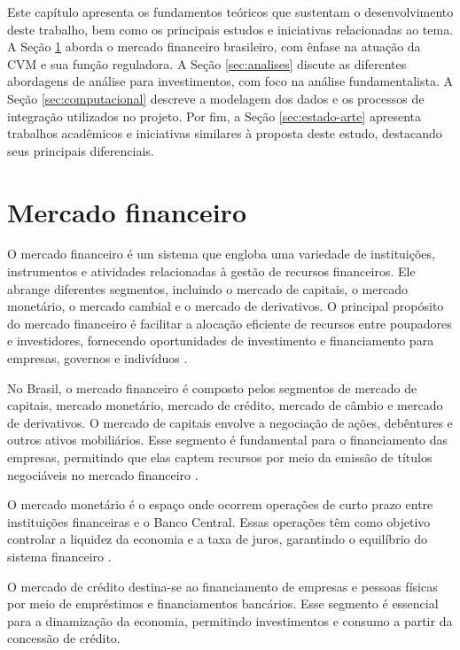 Este capítulo apresenta os fundamentos teóricos que sustentam o desenvolvimento deste trabalho, bem como os principais estudos e iniciativas relacionadas ao tema. A Seção \ref{sec:mercado-financeiro} aborda o mercado financeiro brasileiro, com ênfase na atuação da CVM e sua função reguladora. A Seção \ref{sec:analises} discute as diferentes abordagens de análise para investimentos, com foco na análise fundamentalista. A Seção \ref{sec:computacional} descreve a modelagem dos dados e os processos de integração utilizados no projeto. Por fim, a Seção \ref{sec:estado-arte} apresenta trabalhos acadêmicos e iniciativas similares à proposta deste estudo, destacando seus principais diferenciais.

\section{Mercado financeiro} \label{sec:mercado-financeiro} %

O mercado financeiro é um sistema que engloba uma variedade de instituições, instrumentos e atividades relacionadas à gestão de recursos financeiros. Ele abrange diferentes segmentos, incluindo o mercado de capitais, o mercado monetário, o mercado cambial e o mercado de derivativos. O principal propósito do mercado financeiro é facilitar a alocação eficiente de recursos entre poupadores e investidores, fornecendo oportunidades de investimento e financiamento para empresas, governos e indivíduos \cite{teixeira:2019:mercado, damodaran:2012:investimentos}.

No Brasil, o mercado financeiro é composto pelos segmentos de mercado de capitais, mercado monetário, mercado de crédito, mercado de câmbio e mercado de derivativos. O mercado de capitais envolve a negociação de ações, debêntures e outros ativos mobiliários. Esse segmento é fundamental para o financiamento das empresas, permitindo que elas captem recursos por meio da emissão de títulos negociáveis no mercado financeiro \cite{reis:2021:negociacao}.

O mercado monetário é o espaço onde ocorrem operações de curto prazo entre instituições financeiras e o Banco Central. Essas operações têm como objetivo controlar a liquidez da economia e a taxa de juros, garantindo o equilíbrio do sistema financeiro \cite{deSouzaFigueiredo:2021:mercado}.

O mercado de crédito destina-se ao financiamento de empresas e pessoas físicas por meio de empréstimos e financiamentos bancários. Esse segmento é essencial para a dinamização da economia, permitindo investimentos e consumo a partir da concessão de crédito.

